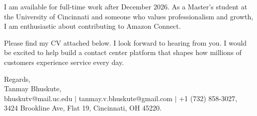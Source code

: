 \documentclass[11pt]{letter}
\begin{document}
\begin{letter}{}
I am available for full-time work after December 2026. As a Master's student at the University of Cincinnati and someone who values professionalism and growth, I am enthusiastic about contributing to Amazon Connect.

Please find my CV attached below. I look forward to hearing from you. I would be excited to help build a contact center platform that shapes how millions of customers experience service every day.

{\setlength{\parskip}{0pt}
Regards,\\
Tanmay Bhuskute,\\
bhuskutv@mail.uc.edu $\mid$ tanmay.v.bhuskute@gmail.com $\mid$ +1 (732) 858-3027,\\
3424 Brookline Ave, Flat 19, Cincinnati, OH 45220.
}

\end{letter}
\end{document}
